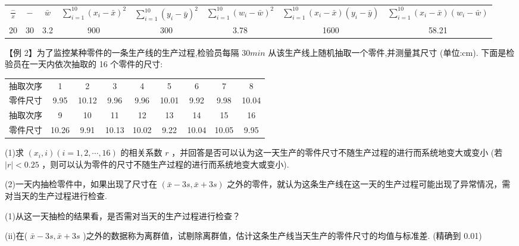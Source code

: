\begin{center}
\begin{tabular}{|c|c|c|c|c|c|c|c|}
\hline
$\frac{ - }{x}$ & − & $\bar{w}$ & $\mathop{\sum }\limits_{{i = 1}}^{{10}}{\left( {x}_{i} - \bar{x}\right) }^{2}$ & $\mathop{\sum }\limits_{{i = 1}}^{{10}}{\left( {y}_{i} - \bar{y}\right) }^{2}$ & $\mathop{\sum }\limits_{{i = 1}}^{{10}}{\left( {w}_{i} - \bar{w}\right) }^{2}$ & $\mathop{\sum }\limits_{{i = 1}}^{{10}}\left( {{x}_{i} - \bar{x}}\right) \left( {{y}_{i} - \bar{y}}\right)$ & $\mathop{\sum }\limits_{{i = 1}}^{{10}}\left( {{x}_{i} - \bar{x}}\right) \left( {{w}_{i} - \bar{w}}\right)$ \\
\cline{1-8}
20 & 30 & 3.2 & 900 & 300 & 3.78 & 1600 & 58.21 \\
\cline{1-8}
\hline
\end{tabular}
\end{center}

【例 2】为了监控某种零件的一条生产线的生产过程,检验员每隔 ${30}{{min}}$ 从该生产线上随机抽取一个零件,并测量其尺寸 (单位:cm). 下面是检验员在一天内依次抽取的 16 个零件的尺寸:

\begin{center}
\begin{tabular}{|c|c|c|c|c|c|c|c|c|}
\hline
抽取次序 & 1 & 2 & 3 & 4 & 5 & 6 & 7 & 8 \\
\cline{1-9}
零件尺寸 & 9.95 & 10.12 & 9.96 & 9.96 & 10.01 & 9.92 & 9.98 & 10.04 \\
\cline{1-9}
抽取次序 & 9 & 10 & 11 & 12 & 13 & 14 & 15 & 16 \\
\cline{1-9}
零件尺寸 & 10.26 & 9.91 & 10.13 & 10.02 & 9.22 & 10.04 & 10.05 & 9.95 \\
\cline{1-9}
\hline
\end{tabular}
\end{center}

(1)求 $\left( {{x}_{i},i}\right) \left( {i = 1,2,\cdots ,{16}}\right)$ 的相关系数 $r$ ，并回答是否可以认为这一天生产的零件尺寸不随生产过程的进行而系统地变大或变小 (若 $\left| r\right|  < {0.25}$ ，则可以认为零件的尺寸不随生产过程的进行而系统地变大或变小).

(2)一天内抽检零件中，如果出现了尺寸在 $\left( {\bar{x} - {3s},\bar{x} + {3s}}\right)$ 之外的零件，就认为这条生产线在这一天的生产过程可能出现了异常情况，需对当天的生产过程进行检查.

(1)从这一天抽检的结果看，是否需对当天的生产过程进行检查？

(ii)在( $\bar{x} - {3s},\bar{x} + {3s}$ )之外的数据称为离群值，试剔除离群值，估计这条生产线当天生产的零件尺寸的均值与标准差. (精确到 0.01)

